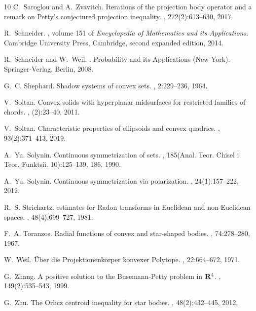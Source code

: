 \documentclass[11pt]{article}
\theoremstyle{definition}
\theoremstyle{proof}
\DeclareMathOperator{\+}{\mathop{\tilde{+}}}
\numberwithin{equation}{section}
\numberwithin{equation}{section}
\begin{document}
\begin{thebibliography}{10}
C.~Saroglou and A.~Zvavitch.
\newblock Iterations of the projection body operator and a remark on {P}etty's
  conjectured projection inequality.
, 272(2):613--630, 2017.

R.~Schneider.
, volume 151 of
  {\em Encyclopedia of Mathematics and its Applications}.
\newblock Cambridge University Press, Cambridge, second expanded edition, 2014.

R.~Schneider and W.~Weil.
.
\newblock Probability and its Applications (New York). Springer-Verlag, Berlin,
  2008.

G.~C. Shephard.
\newblock Shadow systems of convex sets.
, 2:229--236, 1964.

V.~Soltan.
\newblock Convex solids with hyperplanar midsurfaces for restricted families of
  chords.
, (2):23--40, 2011.

V.~Soltan.
\newblock Characteristic properties of ellipsoids and convex quadrics.
, 93(2):371--413, 2019.

A.~Yu. Solynin.
\newblock Continuous symmetrization of sets.
,
  185(Anal. Teor. Chisel i Teor. Funktsi\u{\i}. 10):125--139, 186, 1990.

A.~Yu. Solynin.
\newblock Continuous symmetrization via polarization.
, 24(1):157--222, 2012.

R.~S. Strichartz.
 estimates for {R}adon transforms in {E}uclidean and
  non-{E}uclidean spaces.
, 48(4):699--727, 1981.

F.~A. Toranzos.
\newblock Radial functions of convex and star-shaped bodies.
, 74:278--280, 1967.

W.~Weil.
\newblock \"{U}ber die {P}rojektionenk\"{o}rper konvexer {P}olytope.
, 22:664--672, 1971.

G.~Zhang.
\newblock A positive solution to the {B}usemann-{P}etty problem in {$\bold
  R^4$}.
, 149(2):535--543, 1999.

G.~Zhu.
\newblock The {O}rlicz centroid inequality for star bodies.
, 48(2):432--445, 2012.

\end{thebibliography}
\end{document}
